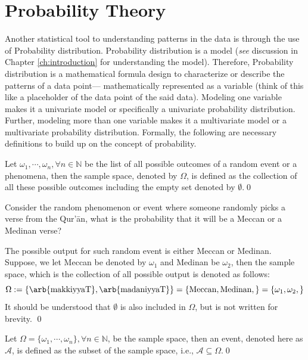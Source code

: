 \section{Probability Theory}\label{sec:probability_method}
Another statistical tool to understanding patterns in the data is through the use of Probability distribution. Probability distribution is a model (\textit{see} discussion in Chapter \ref{ch:introduction} for understanding the model). Therefore, Probability distribution is a mathematical formula design to characterize or describe the patterns of a data point--- mathematically represented as a variable (think of this like a placeholder of the data point of the said data). Modeling one variable makes it a univariate model or specifically a univariate probability distribution. Further, modeling more than one variable makes it a multivariate model or a multivariate probability distribution. Formally, the following are necessary definitions to build up on the concept of probability.
\begin{defnx}
Let $\omega_1,\cdots,\omega_n, \forall n\in\mathbb{N}$ be the list of all possible outcomes of a random event or a phenomena, then the sample space, denoted by $\Omega$, is defined as the collection of all these possible outcomes including the empty set denoted by $\emptyset$.\qed
\end{defnx}
\begin{exmpx}\label{ex:sample_space}
Consider the random phenomenon or event where someone randomly picks a verse from the Qur'\=an, what is the probability that it will be a Meccan  or a Medinan  verse?

The possible output for such random event is either Meccan or Medinan. Suppose, we let Meccan be denoted by $\omega_1$ and Medinan be $\omega_2$, then the sample space, which is the collection of all possible output is denoted as follows:
\begin{equation}\label{ex_eq:sample_space}
    \Omega:=\{\text{\arb{makkiyyaT}},\text{\arb{madaniyyaT}}\}=\{\text{Meccan}, \text{Medinan},\}=\{\omega_1,\omega_2,\}
\end{equation}
It should be understood that $\emptyset$ is also included in $\Omega$, but is not written for brevity.
\qed
\end{exmpx}
\begin{defnx}[Event]
Let $\Omega=\{\omega_1,\cdots,\omega_n\}, \forall n\in\mathbb{N}$, be the sample space, then an event, denoted here as $\mathscr{A}$, is defined as the subset of the sample space, i.e., $\mathscr{A}\subseteq{\Omega}$.\qed
\end{defnx}
